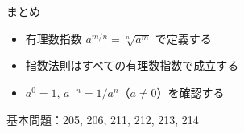 \documentclass[aspectratio=43,professionalfonts,handout]{beamer}
\begin{document}
\begin{frame}{まとめ}
  \begin{itemize}
    \item 有理数指数 $a^{m/n} = \sqrt[n]{a^m}$ で定義する
    \item 指数法則はすべての有理数指数で成立する
    \item $a^0 = 1$, $a^{-n} = 1/a^n$（$a \neq 0$）を確認する
  \end{itemize}

  \vfill
  {\small 基本問題：205, 206, 211, 212, 213, 214}
\end{frame}
\end{document}
